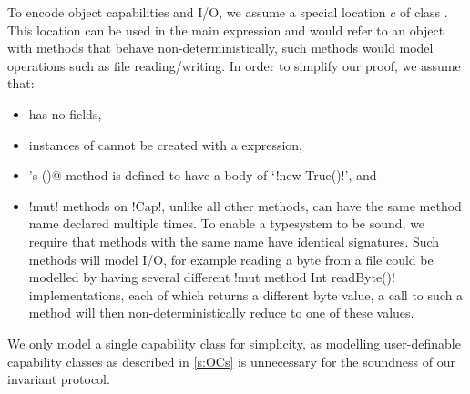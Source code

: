 \noindent To encode object capabilities and I/O, we assume a special location  $c$ of class \Q@Cap@. This location can be used in the main expression and would refer to an object with methods that behave non-deterministically, such methods would model operations such as file reading/writing. In order to simplify our proof, we assume that:
\begin{itemize}
	\item \Q@Cap@ has no fields,
	\item instances of \Q@Cap@ cannot be created with a \Q@new@ expression,
	\item \Q@Cap@'s \Q@invariant()@ method is defined to have a body of `\Q!new True()!', and
	

	
	\item \Q!mut! methods on \Q!Cap!, unlike all other methods, can have the same method name declared multiple times. To enable a typesystem to be sound, we require that methods with the same name have identical signatures.
	Such methods will model I/O, for example reading a byte from a file could be modelled by having several different \Q!mut method Int readByte()! implementations, each of which returns a different byte value,
	a call to such a method will then non-deterministically reduce to one of these values.
\end{itemize}
We only model a single \Q@Cap@ capability class for simplicity, as modelling user-definable capability classes as described in \ref{s:OCs} is unnecessary for the soundness of our invariant protocol.

